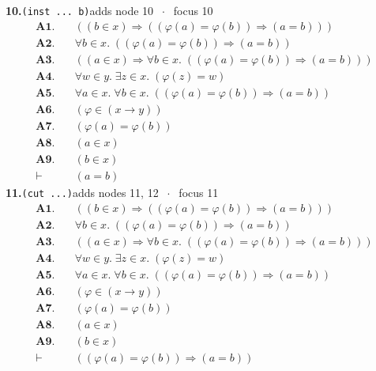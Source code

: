 \documentclass[11pt]{article}
\begin{document}
\medskip\noindent\textbf{10.}\quad \texttt{(inst ... b)}\hfill{\small adds node 10 $\;\cdot\;$ focus 10}\\[2pt]
\begin{align*}
  \mathbf{A1.}\quad & ((b \in x) \Rightarrow ((\varphi(a) = \varphi(b)) \Rightarrow (a = b))) \\
  \mathbf{A2.}\quad & \forall b \in x.\; ((\varphi(a) = \varphi(b)) \Rightarrow (a = b)) \\
  \mathbf{A3.}\quad & ((a \in x) \Rightarrow \forall b \in x.\; ((\varphi(a) = \varphi(b)) \Rightarrow (a = b))) \\
  \mathbf{A4.}\quad & \forall w \in y.\; \exists z \in x.\; (\varphi(z) = w) \\
  \mathbf{A5.}\quad & \forall a \in x.\; \forall b \in x.\; ((\varphi(a) = \varphi(b)) \Rightarrow (a = b)) \\
  \mathbf{A6.}\quad & (\varphi \in (x \to y)) \\
  \mathbf{A7.}\quad & (\varphi(a) = \varphi(b)) \\
  \mathbf{A8.}\quad & (a \in x) \\
  \mathbf{A9.}\quad & (b \in x) \\
  \vdash\quad & (a = b)
\end{align*}
\medskip\noindent\textbf{11.}\quad \texttt{(cut ...)}\hfill{\small adds nodes 11, 12 $\;\cdot\;$ focus 11}\\[2pt]
\begin{align*}
  \mathbf{A1.}\quad & ((b \in x) \Rightarrow ((\varphi(a) = \varphi(b)) \Rightarrow (a = b))) \\
  \mathbf{A2.}\quad & \forall b \in x.\; ((\varphi(a) = \varphi(b)) \Rightarrow (a = b)) \\
  \mathbf{A3.}\quad & ((a \in x) \Rightarrow \forall b \in x.\; ((\varphi(a) = \varphi(b)) \Rightarrow (a = b))) \\
  \mathbf{A4.}\quad & \forall w \in y.\; \exists z \in x.\; (\varphi(z) = w) \\
  \mathbf{A5.}\quad & \forall a \in x.\; \forall b \in x.\; ((\varphi(a) = \varphi(b)) \Rightarrow (a = b)) \\
  \mathbf{A6.}\quad & (\varphi \in (x \to y)) \\
  \mathbf{A7.}\quad & (\varphi(a) = \varphi(b)) \\
  \mathbf{A8.}\quad & (a \in x) \\
  \mathbf{A9.}\quad & (b \in x) \\
  \vdash\quad & ((\varphi(a) = \varphi(b)) \Rightarrow (a = b))
\end{align*}
\end{document}
